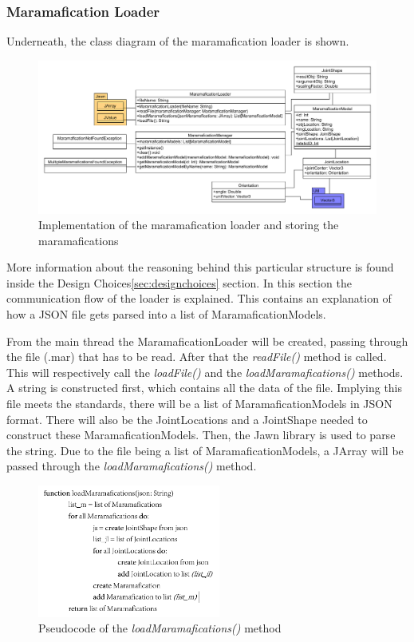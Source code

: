 \documentclass[10pt]{extarticle} %
\begin{document}
    \subsubsection{Maramafication Loader}
    Underneath, the class diagram of the maramafication loader is shown.

    \begin{figure}[htb]
        \centering
        \includegraphics[width=\textwidth, height=\textheight, keepaspectratio]{Marama-Editor}
        \caption{Implementation of the maramafication loader and storing the maramafications}
    \end{figure}
    More information about the reasoning behind this particular structure is found inside the Design Choices\ref{sec:designchoices} section.
    In this section the communication flow of the loader is explained.
    This contains an explanation of how a JSON file gets parsed into a list of MaramaficationModels.

    From the main thread the MaramaficationLoader will be created, passing through the file (.mar) that has to be read.
    After that the \textit{readFile()} method is called.
    This will respectively call the \textit{loadFile()} and the \textit{loadMaramafications()} methods.
    A string is constructed first, which contains all the data of the file.
    Implying this file meets the standards, there will be a list of MaramaficationModels in JSON format.
    There will also be the JointLocations and a JointShape needed to construct these MaramaficationModels.
    Then, the Jawn library is used to parse the string. Due to the file being a list of MaramaficationModels, a JArray will be passed through the \textit{loadMaramafications()} method.
    \newpage
    \begin{figure}[htb]
        \center
        \includegraphics[width=60mm, keepaspectratio]{pseudocode}
        \caption{Pseudocode of the \textit{loadMaramafications()} method}
    \end{figure}
\end{document}
